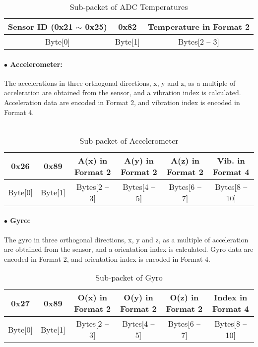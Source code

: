 \begin{table}[h!]
    \centering
    \caption{Sub-packet of ADC Temperatures}
    \begin{tabular}{|c|c|c|}
        \hline
        \rowcolor{black!8}
        \textbf{Sensor ID} (0x21 $\sim$ 0x25) & \textbf{0x82} & \textbf{Temperature in Format 2}\\
        \hline
        Byte[0] & Byte[1] & Bytes[2 -- 3] \\ \hline
    \end{tabular}
\end{table}


\paragraph{$\bullet$ Accelerometer:}
The accelerations in three orthogonal directions, x, y and z, as a multiple of acceleration are obtained from the sensor, and a vibration index is calculated. 
Acceleration data are encoded in Format 2, and vibration index is encoded in Format 4. 
\\\\

\begin{table}[h!]
    \centering
    \caption{Sub-packet of Accelerometer}
    \begin{tabular}{|c|c|c|c|c|c|}
        \hline
        \rowcolor{black!8}
        \textbf{0x26} & \textbf{0x89} & \textbf{A(x) in Format 2} & \textbf{A(y) in Format 2} & \textbf{A(z) in Format 2}& \textbf{Vib. in Format 4}\\
        \hline
        Byte[0] & Byte[1] & Bytes[2 -- 3] & Bytes[4 -- 5] & Bytes[6 -- 7] & Bytes[8 -- 10] \\ \hline
    \end{tabular}
\end{table}


\paragraph{$\bullet$ Gyro:}
The gyro in three orthogonal directions, x, y and z, as a multiple of acceleration are obtained from the sensor, and a orientation index is calculated. 
Gyro data are encoded in Format 2, and orientation index is encoded in Format 4.

\begin{table}[h!]
    \centering
    \caption{Sub-packet of Gyro}
    \begin{tabular}{|c|c|c|c|c|c|}
        \hline
        \rowcolor{black!8}
        \textbf{0x27} & \textbf{0x89} & \textbf{O(x) in Format 2} & \textbf{O(y) in Format 2} & \textbf{O(z) in Format 2}& \textbf{Index in Format 4}\\
        \hline
        Byte[0] & Byte[1] & Bytes[2 -- 3] & Bytes[4 -- 5] & Bytes[6 -- 7] & Bytes[8 -- 10] \\ \hline
    \end{tabular}
\end{table}
